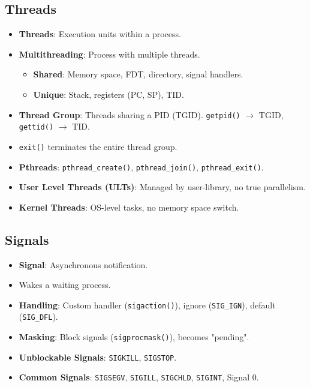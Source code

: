 \documentclass[8pt,a4paper]{article}
\begin{document}
\begin{multicols}{2}
\subsection*{Threads}
\begin{itemize}
    \item \textbf{Threads}: Execution units within a process.
    \item \textbf{Multithreading}: Process with multiple threads.
    \begin{itemize}
        \item \textbf{Shared}: Memory space, FDT, directory, signal handlers.
        \item \textbf{Unique}: Stack, registers (PC, SP), TID.
    \end{itemize}
    \item \textbf{Thread Group}: Threads sharing a PID (TGID). \texttt{getpid()} $\to$ TGID, \texttt{gettid()} $\to$ TID.
    \item \texttt{exit()} terminates the entire thread group.
    \item \textbf{Pthreads}: \texttt{pthread\_create()}, \texttt{pthread\_join()}, \texttt{pthread\_exit()}.
    \item \textbf{User Level Threads (ULTs)}: Managed by user-library, no true parallelism.
    \item \textbf{Kernel Threads}: OS-level tasks, no memory space switch.
\end{itemize}

\subsection*{Signals}
\begin{itemize}
    \item \textbf{Signal}: Asynchronous notification.
    \item Wakes a waiting process.
    \item \textbf{Handling}: Custom handler (\texttt{sigaction()}), ignore (\texttt{SIG\_IGN}), default (\texttt{SIG\_DFL}).
    \item \textbf{Masking}: Block signals (\texttt{sigprocmask()}), becomes "pending".
    \item \textbf{Unblockable Signals}: \texttt{SIGKILL}, \texttt{SIGSTOP}.
    \item \textbf{Common Signals}: \texttt{SIGSEGV}, \texttt{SIGILL}, \texttt{SIGCHLD}, \texttt{SIGINT}, Signal 0.
\end{itemize}


\end{multicols}
\end{document}
